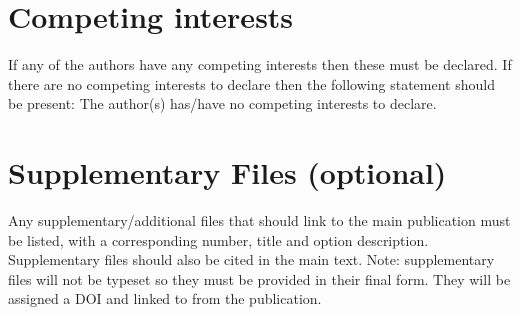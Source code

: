 \documentclass{article}
\begin{document}
\section*{Competing interests} 
If any of the authors have any competing interests then these must be declared. If there are no competing interests to declare then the following statement should be present: The author(s) has/have no competing interests to declare.




\section*{Supplementary Files (optional)}
Any supplementary/additional files that should link to the main publication must be listed, with a corresponding number, title and option description. Supplementary files should also be cited in the main text.
Note: supplementary files will not be typeset so they must be provided in their final form. They will be assigned a DOI and linked to from the publication.
\end{document}
